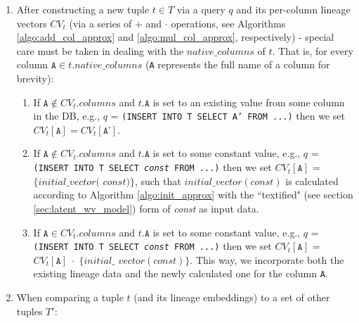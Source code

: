 \begin{enumerate}
    
    
    \item After constructing a new tuple $t \in T$ via a query $q$ and its per-column lineage vectors $CV_t$ (via a series of + and $\cdot$ operations, see Algorithms \ref{algo:add_col_approx} and \ref{algo:mul_col_approx}, respectively) - special care must be taken in dealing with the $native\_columns$ of $t$.
    That is, for every column $\texttt{A} \in t.native\_columns$ (\texttt{A} represents the full name of a column for brevity):
    \begin{enumerate}
        \item If $\texttt{A} \notin CV_t.columns$ and $t.\texttt{A}$ is set to an existing value from some column in the DB, e.g., $q$ = \texttt{(INSERT INTO T SELECT A' FROM ...)} then we set $CV_t[\texttt{A}] = CV_t[\texttt{A'}]$.
        \item If $\texttt{A} \notin CV_t.columns$ and $t.\texttt{A}$ is set to some constant value, e.g., $q$ = \texttt{(INSERT INTO T SELECT \textit{const} FROM ...)} then we set $CV_t[\texttt{A}]$ = $\{initial\_vector($ $const)\}$, such that $initial\_vector(const)$ is calculated according to Algorithm \ref{algo:init_approx} with the ``textified" (see section \ref{sec:latent_wv_model}) form of \textit{const} as input data.
        \item If $\texttt{A} \in CV_t.columns$ and $t.\texttt{A}$ is set to some constant value, e.g., $q$ = \texttt{(INSERT INTO T SELECT \textit{const} FROM ...)} then we set $CV_t[\texttt{A}]$ = $CV_t[\texttt{A}]\; \cdot \; \{initial\_$ $vector(const)\}$. This way, we incorporate both the existing lineage data and the newly calculated one for the column \texttt{A}.
    \end{enumerate}
    \item When comparing a tuple $t$ (and its lineage embeddings) to a set of other tuples $T'$:

\end{enumerate}
